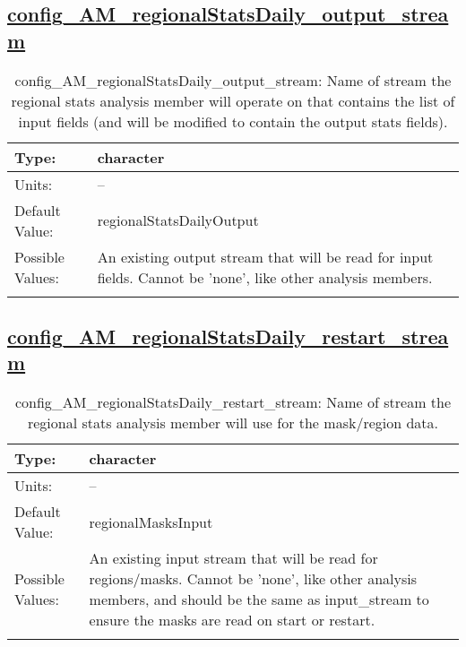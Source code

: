 \subsection[config\_AM\_regionalStatsDaily\_output\_stream]{\hyperref[sec:nm_tab_AM_regionalStatsDaily]{config\_AM\_regionalStatsDaily\_output\_stream}}
\label{subsec:nm_sec_config_AM_regionalStatsDaily_output_stream}
\begin{center}
\begin{longtable}{| p{2.0in} || p{4.0in} |}
    \hline
    Type: & character \\
    \hline
    Units: & -- \\
    \hline
    Default Value: & regionalStatsDailyOutput \\
    \hline
    Possible Values: & An existing output stream that will be read for input fields. Cannot be 'none', like other analysis members. \\
    \hline
    \caption{config\_AM\_regionalStatsDaily\_output\_stream: Name of stream the regional stats analysis member will operate on that contains the list of input fields (and will be modified to contain the output stats fields).}
\end{longtable}
\end{center}
\subsection[config\_AM\_regionalStatsDaily\_restart\_stream]{\hyperref[sec:nm_tab_AM_regionalStatsDaily]{config\_AM\_regionalStatsDaily\_restart\_stream}}
\label{subsec:nm_sec_config_AM_regionalStatsDaily_restart_stream}
\begin{center}
\begin{longtable}{| p{2.0in} || p{4.0in} |}
    \hline
    Type: & character \\
    \hline
    Units: & -- \\
    \hline
    Default Value: & regionalMasksInput \\
    \hline
    Possible Values: & An existing input stream that will be read for regions/masks. Cannot be 'none', like other analysis members, and should be the same as input\_stream to ensure the masks are read on start or restart. \\
    \hline
    \caption{config\_AM\_regionalStatsDaily\_restart\_stream: Name of stream the regional stats analysis member will use for the mask/region data.}
\end{longtable}
\end{center}
